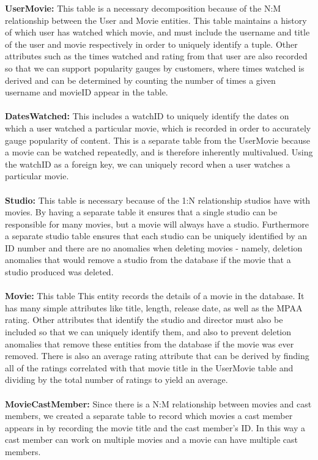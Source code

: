 \documentclass[12pt]{article}
\begin{document}
    \textbf{User\textunderscore Movie:} This table is a necessary decomposition because of the N:M relationship between the User and Movie entities. This table maintains a history of which user has watched which movie, and must include the username and title of the user and movie respectively in order to uniquely identify a tuple. Other attributes such as the times watched and rating from that user are also recorded so that we can support popularity gauges by customers, where times watched is derived and can be determined by counting the number of times a given username and movieID appear in the table.\\ \\
    \textbf{Dates\textunderscore Watched:} This includes a watchID to uniquely identify the dates on which a user watched a particular movie, which is recorded in order to accurately gauge popularity of content. This is a separate table from the User\textunderscore Movie because a movie can be watched repeatedly, and is therefore inherently multivalued. Using the watchID as a foreign key, we can uniquely record when a user watches a particular movie.\\ \\
    \textbf{Studio:} This table is necessary because of the 1:N relationship studios have with movies. By having a separate table it ensures that a single studio can be responsible for many movies, but a movie will always have a studio. Furthermore a separate studio table ensures that each studio can be uniquely identified by an ID number and there are no anomalies when deleting movies - namely, deletion anomalies that would remove a studio from the database if the movie that a studio produced was deleted.\\ \\
    \textbf{Movie:} This table This entity records the details of a movie in the database. It has many simple attributes like title, length, release date, as well as the MPAA rating. Other attributes that identify the studio and director must also be included so that we can uniquely identify them, and also to prevent deletion anomalies that remove these entities from the database if the movie was ever removed. There is also an average rating attribute that can be derived by finding all of the ratings correlated with that movie title in the User\textunderscore Movie table and dividing by the total number of ratings to yield an average.\\ \\
    \textbf{Movie\textunderscore Cast\textunderscore Member:} Since there is a N:M relationship between movies and cast members, we created a separate table to record which movies a cast member appears in by recording the movie title and the cast member's ID. In this way a cast member can work on multiple movies and a movie can have multiple cast members.\\ \\
\end{document}

